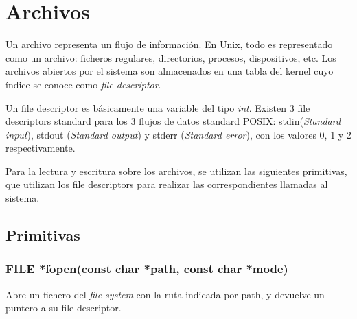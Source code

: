 \documentclass[a4paper, twoside]{article}
\newcommand{\rutapaquetes}{./paquetes-apunte}
\begin{document}
\maketitle %

\tableofcontents %


\section{Archivos}
Un archivo representa un flujo de información. En Unix, todo es representado como un archivo: ficheros regulares, directorios, procesos, dispositivos, etc. Los archivos abiertos por el sistema son almacenados en una tabla del kernel cuyo índice se conoce como \emph{file descriptor}. 

Un file descriptor es básicamente una variable del tipo \emph{int}. Existen 3 file descriptors standard para los 3 flujos de datos standard POSIX:
stdin(\emph{Standard input}), stdout (\emph{Standard output}) y stderr (\emph{Standard error}), con los valores 0, 1 y 2 respectivamente.

Para la lectura y escritura sobre los archivos, se utilizan las siguientes primitivas, que utilizan los file descriptors para realizar las correspondientes llamadas al sistema.

\subsection{Primitivas}
\subsubsection {FILE *fopen(const char *path, const char *mode)}
Abre un fichero del \emph{file system} con la ruta indicada por path, y devuelve un puntero a su file descriptor.
\end{document}
